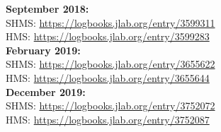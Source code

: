 \documentclass[11pt]{article}
\begin{document}
\noindent \textbf{September 2018:}\\
SHMS: \url{https://logbooks.jlab.org/entry/3599311}\\
HMS: \url{https://logbooks.jlab.org/entry/3599283}\\

\noindent \textbf{February 2019:}\\
SHMS: \url{https://logbooks.jlab.org/entry/3655622}\\
HMS: \url{https://logbooks.jlab.org/entry/3655644}\\

\noindent \textbf{December 2019:}\\
SHMS: \url{https://logbooks.jlab.org/entry/3752072}\\
HMS: \url{https://logbooks.jlab.org/entry/3752087}\\


\newpage
\onecolumn


\end{document}
